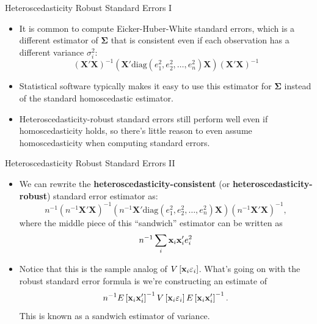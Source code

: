 \begin{frame}{Heteroscedasticity Robust Standard Errors I}
\begin{itemize}
	\item It is common to compute Eicker-Huber-White standard errors, which 
	is a different estimator of $\boldsymbol{\Sigma}$ that is consistent
	even if each observation has a different variance $\sigma_i^{2}$:\[
\left(\boldsymbol{X}'\boldsymbol{X}\right)^{-1}\left(\boldsymbol{X}'\text{diag}\left(e_{1}^{2},e_{2}^{2},\dots,e_{n}^{2}\right)\boldsymbol{X}\right)\left(\boldsymbol{X}'\boldsymbol{X}\right)^{-1}
\]

	\item Statistical software typically makes it easy to use this estimator for
	 $\boldsymbol{\Sigma}$ instead of the standard homoscedastic estimator.

	\item Heteroscedasticity-robust standard errors still perform well even if homoscedasticity
		holds, so there's little reason to even assume homoscedasticity when computing standard errors. 
\end{itemize}
\end{frame}





\begin{frame}{Heteroscedasticity Robust Standard Errors II}
\begin{itemize}
	\item We can rewrite the {\bf heteroscedasticity-consistent} (or {\bf heteroscedasticity-robust}) standard error estimator as:\[
n^{-1}\left(n^{-1}\boldsymbol{X}'\boldsymbol{X}\right)^{-1}\left(n^{-1}\boldsymbol{X}'\text{diag}\left(e_{1}^{2},e_{2}^{2},\dots,e_{n}^{2}\right)\boldsymbol{X}\right)\left(n^{-1}\boldsymbol{X}'\boldsymbol{X}\right)^{-1},
\]
where the middle piece of this ``sandwich'' estimator can be written as\[
	n^{-1} \sum_{i} {\bf x}_i {\bf x}'_i  e_i^2
	\]

	\item Notice that this is the sample analog of $V\left[{\bf x}_i \varepsilon_i \right]$. What's going on with the robust
	standard error formula is we're constructing an estimate of \[
		n^{-1} E\left[{\bf x}_i {\bf x}'_i\right]^{-1} V\left[{\bf x}_i \varepsilon_i \right] E\left[{\bf x}_i {\bf x}'_i\right]^{-1}.
	\]
	This is known as a sandwich estimator of variance. 
\end{itemize}
\end{frame}





